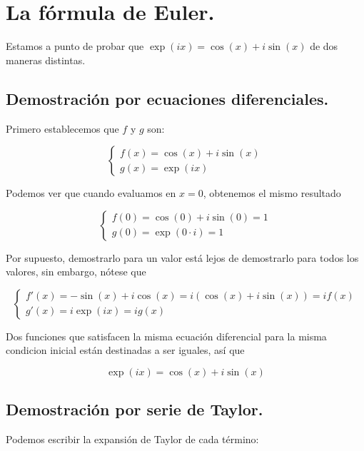 \section{La fórmula de Euler.}

Estamos a punto de probar que $\exp(ix) = \cos(x) + i\sin(x)$ de dos maneras distintas.

\subsection{Demostración por ecuaciones diferenciales.}

Primero establecemos que $f$ y $g$ son:

\begin{equation}
\begin{cases}
	f(x) = \cos(x) + i\sin(x) \\
	g(x) = \exp(ix)
\end{cases}
\end{equation}

Podemos ver que cuando evaluamos en $x = 0$, obtenemos el mismo resultado

\begin{equation}
\begin{cases}
	f(0) = \cos(0) + i\sin(0) = 1 \\
	g(0) = \exp(0\cdot i) = 1
\end{cases}
\end{equation}

Por supuesto, demostrarlo para un valor está lejos de demostrarlo para todos los valores, sin embargo, nótese que

\begin{equation}
\begin{cases}
	f'(x) = -\sin(x) + i\cos(x) = i(\cos(x) + i\sin(x)) = if(x) \\
	g'(x) = i\exp(ix) = ig(x)
\end{cases}
\end{equation}

Dos funciones que satisfacen la misma ecuación diferencial para la misma condicion inicial están destinadas a ser iguales, así que

$$\exp(ix) = \cos(x) + i\sin(x)$$

\subsection{Demostración por serie de Taylor.}

Podemos escribir la expansión de Taylor de cada término:


